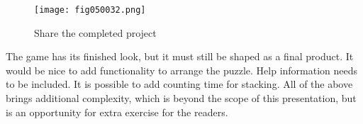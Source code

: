 \begin{figure}[H]
   \centering
   \texttt{[image: fig050032.png]}
   \caption{Share the completed project}
\label{fig050032}
\end{figure}

The game has its finished look, but it must still be shaped as a final product. It would be nice to add functionality to arrange the puzzle. Help information needs to be included. It is possible to add counting time for stacking. All of the above brings additional complexity, which is beyond the scope of this presentation, but is an opportunity for extra exercise for the readers.
